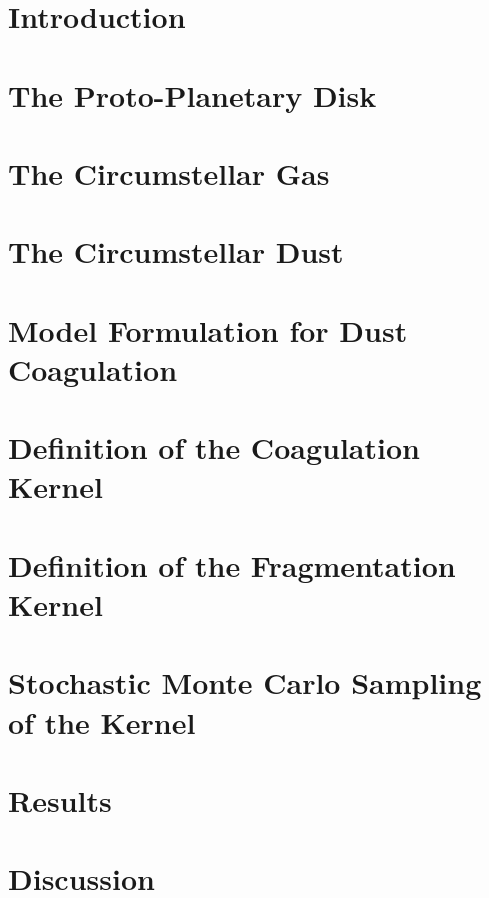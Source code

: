 \chapter{Introduction}
    \label{ch:introduction}
    
\chapter{The Proto-Planetary Disk}
    \label{ch:disk}
    
\chapter{The Circumstellar Gas}
    \label{ch:gas}
    
\chapter{The Circumstellar Dust}
    \label{ch:dust}
    
\chapter{Model Formulation for Dust Coagulation}
    \label{ch:smoluchoswki}
    
\chapter{Definition of the Coagulation Kernel}
    \label{ch:coagulation}
    
\chapter{Definition of the Fragmentation Kernel}
    \label{ch:fragmentation}
    
\chapter{Stochastic Monte Carlo Sampling of the Kernel}
    \label{ch:sampling}
    
\chapter{Results}
    \label{ch:results}
    
\chapter{Discussion}
    \label{ch:discussion}
    
